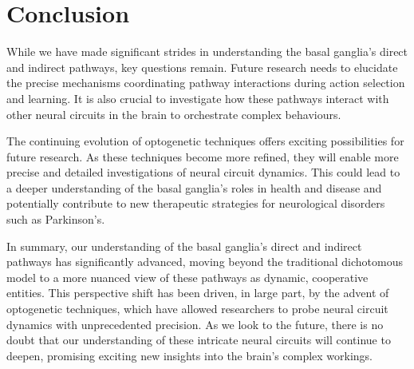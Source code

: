 \documentclass[10pt]{article}
\begin{document}
\begin{sloppypar}
  \section{Conclusion}
  \label{sec:conclusion}

  While we have made significant strides in understanding the basal ganglia’s direct and indirect pathways, key questions remain. Future research needs to elucidate the precise mechanisms coordinating pathway interactions during action selection and learning. It is also crucial to investigate how these pathways interact with other neural circuits in the brain to orchestrate complex behaviours.

  The continuing evolution of optogenetic techniques offers exciting possibilities for future research. As these techniques become more refined, they will enable more precise and detailed investigations of neural circuit dynamics. This could lead to a deeper understanding of the basal ganglia’s roles in health and disease and potentially contribute to new therapeutic strategies for neurological disorders such as Parkinson’s.

  In summary, our understanding of the basal ganglia’s direct and indirect pathways has significantly advanced, moving beyond the traditional dichotomous model to a more nuanced view of these pathways as dynamic, cooperative entities. This perspective shift has been driven, in large part, by the advent of optogenetic techniques, which have allowed researchers to probe neural circuit dynamics with unprecedented precision. As we look to the future, there is no doubt that our understanding of these intricate neural circuits will continue to deepen, promising exciting new insights into the brain’s complex workings.

  \pagebreak
  \singlespacing %
  
  

\end{sloppypar}
\end{document}
